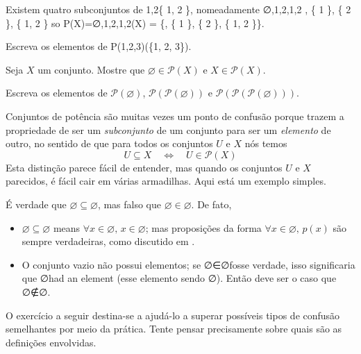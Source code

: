 \begin{example}
Existem quatro subconjuntos de {1,2}\{ 1, 2 \}, nomeadamente
∅,{1},{2},{1,2} \varnothing, \quad \{ 1 \}, \quad \{ 2 \}, \quad \{ 1, 2 \} 
so P(X)={∅,{1},{2},{1,2}}(X) = \{\varnothing, \{ 1 \}, \{ 2 \}, \{ 1, 2 \}\}.
\end{example}

\begin{exercise}
Escreva os elementos de P({1,2,3})(\{1, 2, 3\}).
\end{exercise}

\begin{exercise}
Seja $X$ um conjunto. Mostre que $\varnothing \in \mathcal{P}(X)$ e $X \in \mathcal{P}(X)$.
\end{exercise}

\begin{exercise}
Escreva os elementos de $\mathcal{P}(\varnothing)$, $\mathcal{P}(\mathcal{P}(\varnothing))$ e $\mathcal{P}(\mathcal{P}(\mathcal{P}(\varnothing)))$.
\end{exercise}

Conjuntos de potência são muitas vezes um ponto de confusão porque trazem a propriedade de ser um \textit{subconjunto} de um conjunto para ser um \textit{elemento} de outro, no sentido de que para todos os conjuntos $U$ e $X$ nós temos
\[ U \subseteq X \quad \Leftrightarrow \quad U \in \mathcal{P}(X) \]
Esta distinção parece fácil de entender, mas quando os conjuntos $U$ e $X$ parecidos, é fácil cair em várias armadilhas. Aqui está um exemplo simples.
\begin{example}
É verdade que $\varnothing \subseteq \varnothing$, mas falso que $\varnothing \in \varnothing$. De fato,
\begin{itemize}
\item $\varnothing \subseteq \varnothing$ means $\forall x \in \varnothing,\, x \in \varnothing$; mas proposições da forma $\forall x \in \varnothing,\, p(x)$ são sempre verdadeiras, como discutido em .
\item O conjunto vazio não possui elementos; se ∅∈∅\varnothing \in \varnothing fosse verdade, isso significaria que ∅\varnothing had an element (esse elemento sendo ∅\varnothing). Então deve ser o caso que ∅∉∅\varnothing \not \in \varnothing.
\end{itemize}
\end{example}

O exercício a seguir destina-se a ajudá-lo a superar possíveis tipos de confusão semelhantes por meio da prática. Tente pensar precisamente sobre quais são as definições envolvidas.

